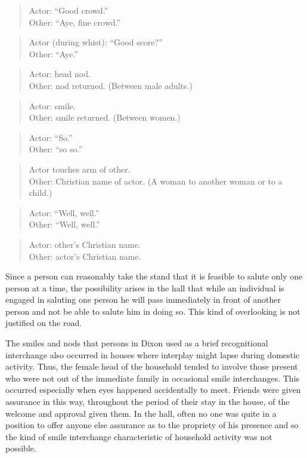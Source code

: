 \documentclass[twoside,symmetric,nobib,justified]{tufte-book}
\begin{document}
\begin{quote}
Actor: ``Good crowd.'' \\
Other: ``Aye, fine crowd.''
\end{quote}

\begin{quote}
Actor (during whist): ``Good score?'' \\
Other: ``Aye.''
\end{quote}

\begin{quote}
Actor: head nod. \\
Other: nod returned. (Between male adults.)
\end{quote}

\begin{quote}
Actor: smile. \\
Other: smile returned. (Between women.)
\end{quote}

\begin{quote}
Actor: ``So.'' \\
Other: ``so so.''
\end{quote}

\begin{quote}
Actor touches arm of other. \\
Other: Christian name of actor. (A woman to another woman or to a
child.)
\end{quote}

\begin{quote}
Actor: ``Well, well.'' \\
Other: ``Well, well.''
\end{quote}

\begin{quote}
Actor: other's Christian name. \\
Other: actor's Christian name.
\end{quote}

\noindent Since a person can reasonably take the stand that it is feasible to
salute only one person at a time, the possibility arises in the hall
that while an individual is engaged in saluting one person he will pass
immediately in front of another person and not be able to salute him in
doing so. This kind of overlooking is not justified on the road.

The smiles and nods that persons in Dixon used as a brief recognitional
interchange also occurred in houses where interplay might lapse during
domestic activity. Thus, the female head of the household tended to
involve those present who were not out of the immediate family in
occasional smile interchanges. This occurred especially when eyes
happened accidentally to meet. Friends were given assurance in this way,
throughout the period of their stay in the house, of the welcome and
approval given them. In the hall, often no one was quite in a position
to offer anyone else assurance as to the propriety of his presence and
so the kind of smile interchange characteristic of household activity
was not possible.
\end{document}
